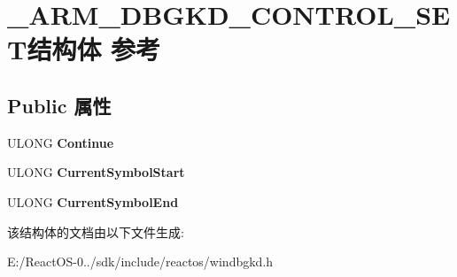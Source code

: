 \hypertarget{struct___a_r_m___d_b_g_k_d___c_o_n_t_r_o_l___s_e_t}{}\section{\+\_\+\+A\+R\+M\+\_\+\+D\+B\+G\+K\+D\+\_\+\+C\+O\+N\+T\+R\+O\+L\+\_\+\+S\+E\+T结构体 参考}
\label{struct___a_r_m___d_b_g_k_d___c_o_n_t_r_o_l___s_e_t}
\subsection*{Public 属性}
\begin{DoxyCompactItemize}
\item 
\mbox{\label{struct___a_r_m___d_b_g_k_d___c_o_n_t_r_o_l___s_e_t_a9ab80fc73d08d633900d1eceedb06900}} 
U\+L\+O\+NG {\bfseries Continue}
\item 
\mbox{\label{struct___a_r_m___d_b_g_k_d___c_o_n_t_r_o_l___s_e_t_a45e62b5fbba4145792aacf22014e9131}} 
U\+L\+O\+NG {\bfseries Current\+Symbol\+Start}
\item 
\mbox{\label{struct___a_r_m___d_b_g_k_d___c_o_n_t_r_o_l___s_e_t_a0488cfdeb5af361703af669fc3d6deda}} 
U\+L\+O\+NG {\bfseries Current\+Symbol\+End}
\end{DoxyCompactItemize}


该结构体的文档由以下文件生成\+:\begin{DoxyCompactItemize}
\item 
E\+:/\+React\+O\+S-\/0../sdk/include/reactos/windbgkd.\+h\end{DoxyCompactItemize}
